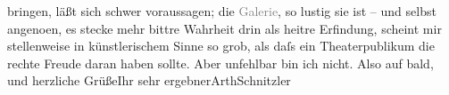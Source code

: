 \begin{ledgroupsized}[t]{13cm}
               bringen, läßt sich schwer voraussagen; die \textcolor{gray}{Galerie}, so lustig sie
               ist – und selbst angeno{\geminationm}en, es stecke mehr bittre
               Wahrheit drin als heitre Erfindung, scheint mir stellenweise in künstlerischem Sinne
               so grob, als daſs ein Theaterpublikum die rechte Freude daran haben sollte.\pend
           \pstart Aber unfehlbar bin ich nicht. Also auf bald, und herzliche Grüße\hspace*{1.5em}Ihr sehr ergebner\spacefill\mbox{ArthSchnitzler}\pend{}
         
         \endnumbering{}\end{ledgroupsized}  \newcommand{\dateiname}{L02512}\newcommand{\titel}{Arthur Schnitzler an Robert Adam, 14. 6. 1929}\newcommand{\editorInnen}{Martin Anton Müller und Gerd-Hermann Susen}
      